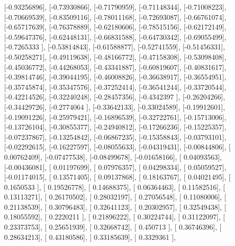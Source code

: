 \documentclass{article}
\begin{document}
       [-0.93256896],
       [-0.73930866],
       [-0.71790959],
       [-0.71148344],
       [-0.71008223],
       [-0.70669539],
       [-0.83509116],
       [-0.78011168],
       [-0.72693087],
       [-0.66761074],
       [-0.65717639],
       [-0.76378889],
       [-0.62180606],
       [-0.78515156],
       [-0.62172149],
       [-0.59647376],
       [-0.62448131],
       [-0.66831588],
       [-0.64730342],
       [-0.69055499],
       [-0.7265333 ],
       [-0.53814843],
       [-0.61588877],
       [-0.52741559],
       [-0.51456331],
       [-0.50258271],
       [-0.49119638],
       [-0.48166772],
       [-0.47158308],
       [-0.53098408],
       [-0.45036772],
       [-0.44268053],
       [-0.43341887],
       [-0.60819607],
       [-0.40831617],
       [-0.39814746],
       [-0.39044195],
       [-0.46008826],
       [-0.36638917],
       [-0.36554951],
       [-0.35745874],
       [-0.35347576],
       [-0.37252414],
       [-0.36541244],
       [-0.33720544],
       [-0.42214526],
       [-0.32240248],
       [-0.28457356],
       [-0.4342397 ],
       [-0.26204266],
       [-0.34429726],
       [-0.2774064 ],
       [-0.33642133],
       [-0.33024589],
       [-0.19912601],
       [-0.19091226],
       [-0.25979421],
       [-0.16896539],
       [-0.32722761],
       [-0.15713006],
       [-0.13726104],
       [-0.30855377],
       [-0.24940812],
       [-0.17266236],
       [-0.15225357],
       [-0.07237867],
       [-0.13254842],
       [-0.06867235],
       [-0.15358843],
       [-0.03793101],
       [-0.02292615],
       [-0.16227597],
       [-0.08055633],
       [-0.04319431],
       [-0.00844806],
       [ 0.00762409],
       [-0.07477538],
       [-0.08499678],
       [-0.01658166],
       [ 0.04093563],
       [-0.00436081],
       [ 0.01197699],
       [ 0.07976357],
       [ 0.04298334],
       [ 0.05059527],
       [-0.01174015],
       [ 0.13571405],
       [ 0.09137868],
       [ 0.18163767],
       [ 0.04021495],
       [ 0.1650533 ],
       [ 0.19526778],
       [ 0.14688375],
       [ 0.06364463],
       [ 0.11582516],
       [ 0.13113271],
       [ 0.26170502],
       [ 0.28032197],
       [ 0.27056548],
       [ 0.11080006],
       [ 0.21138539],
       [ 0.30796483],
       [ 0.32641123],
       [ 0.20302957],
       [ 0.32549438],
       [ 0.18055592],
       [ 0.2220211 ],
       [ 0.21896222],
       [ 0.30224744],
       [ 0.31122097],
       [ 0.23373753],
       [ 0.25651939],
       [ 0.32668742],
       [ 0.450713  ],
       [ 0.36746396],
       [ 0.28634213],
       [ 0.43180586],
       [ 0.33185639],
       [ 0.3329361 ],
\end{document}
